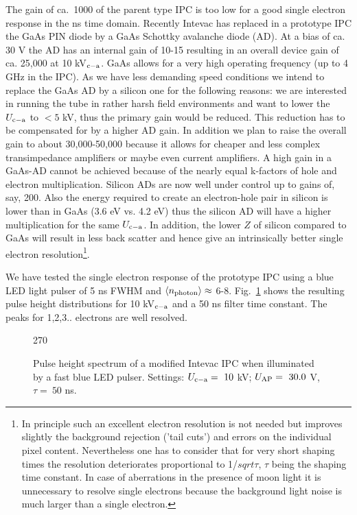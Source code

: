 \medskip The gain of ca.\ 1000 of the parent type IPC is too low for a good
single electron response in the ns time domain. Recently Intevac has
replaced in a prototype IPC the GaAs PIN diode by a GaAs Schottky avalanche
diode (AD). At a bias of ca. 30 V the AD has an internal gain of 10-15
resulting in an overall device gain of ca. 25,000 at 10 kV$_{{\rm c-a}}$.
GaAs allows for a very high operating frequency (up to 4 GHz in the IPC). As
we have less demanding speed conditions we intend to replace the GaAs AD by
a silicon one for the following reasons: we are interested in running the
tube in rather harsh field environments and want to lower the $U_{{\rm c-a}}$
to $< 5$ kV, thus the primary gain would be reduced. This reduction has to
be compensated for by a higher AD gain. In addition we plan to raise the
overall gain to about {\mbox30,000}-{\mbox50,000} because it allows for cheaper and less
complex transimpedance amplifiers
or maybe even current amplifiers. A high gain in a GaAs-AD cannot be
achieved because of the nearly equal k-factors of hole and electron
multiplication. Silicon ADs are now well under control up to gains of, say,
200. Also the energy required to create an electron-hole pair in silicon is
lower than in GaAs (3.6 eV vs. 4.2 eV) thus the silicon AD will have a
higher multiplication for the same $U_{{\rm c-a}}$. In addition, the lower $Z$
of silicon compared to GaAs will result in less back scatter and hence give
an intrinsically better single electron resolution\footnote{In principle
such an excellent electron resolution is not needed but improves slightly
the background rejection ('tail cuts') and errors on the individual pixel content.
Nevertheless one has to consider that for very short shaping times the resolution deteriorates
proportional to 1/$sqrt{\tau}$, $\tau$ being the shaping time constant. In case of
aberrations in the presence of moon light it is unnecessary to resolve
single electrons because the background light noise is much larger than a single
electron.}.

We have tested the single electron response of the prototype IPC using a
blue LED light pulser of 5 ns FWHM and $\langle n_{{\rm photon}}\rangle
\approx $ 6-8. 
Fig.~\ref{fig-phe} shows the resulting pulse height distributions for
10 kV$_{{\rm c-a}}$ and a 50 ns filter time constant. The peaks for 1,2,3..
electrons are well resolved.

\begin{figure}[htb]
\begin{center}
\begin{turn}{270}
\end{turn}
\vspace{1cm}
\caption{Pulse height spectrum of a
modified Intevac IPC when illuminated by a fast blue LED pulser. Settings: $%
U_{{\rm c-a}}=\ 10$ kV; $U_{{\rm AP}}=\ 30.0$ V, $\tau =\ 50$ ns.}
\label{fig-phe}
\end{center}
\end{figure}

